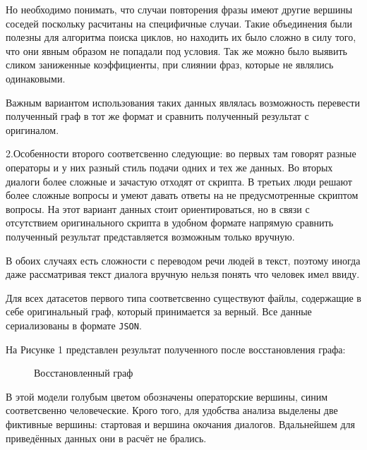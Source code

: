 \documentclass[specification,annotation]{itmo-student-thesis}
\begin{document}
	Но необходимо понимать, что случаи повторения фразы имеют другие вершины соседей поскольку расчитаны на специфичные случаи. Такие объединения были полезны для алгоритма поиска циклов, но находить их было сложно в силу того, что они явным образом не попадали под условия. Так же можно было выявить сликом заниженные коэффициенты, при слиянии фраз, которые не являлись одинаковыми. 
	
	Важным вариантом использования таких данных являлась возможность  перевести полученный граф в тот же формат и сравнить полученный результат с оригиналом.
	
	2.Особенности второго соответсвенно следующие: во первых там говорят разные операторы и у них разный стиль подачи одних и тех же данных. Во вторых диалоги более сложные и зачастую отходят от скрипта. В третьих люди решают более сложные вопросы и умеют давать ответы на не предусмотренные скриптом вопросы. На этот вариант данных стоит ориентироваться, но в связи с отсутствием оригинального скрипта в удобном формате напрямую сравнить полученный результат представляется возможным только вручную.
	
	В обоих случаях есть сложности с переводом речи людей в текст, поэтому иногда даже рассматривая текст диалога вручную нельзя понять что человек имел ввиду.
	
	Для всех датасетов первого типа соответсвенно существуют файлы, содержащие в себе оригинальный граф, который принимается за верный. Все данные сериализованы в формате \texttt{JSON}. 
	
	На Рисунке 1 представлен результат полученного после восстановления графа:
	
	\begin{figure}[H]
		\caption{Восстановленный граф}
		\label{fig:image}
	\end{figure}

	В этой модели голубым цветом обозначены операторские вершины, синим соответсвенно человеческие. Крого того, для удобства анализа выделены две фиктивные вершины: стартовая и вершина окочания диалогов. Вдальнейшем для приведённых данных они в расчёт не брались.
	
\end{document}
